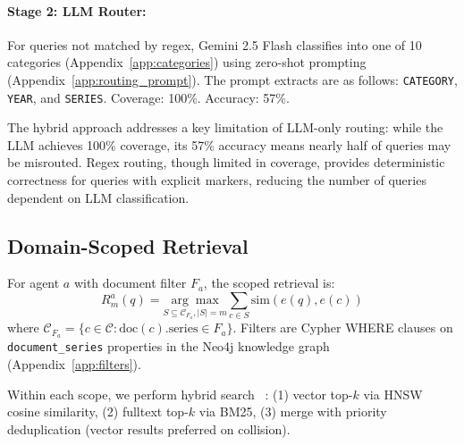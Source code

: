 \documentclass{article}
\begin{document}
\paragraph{Stage 2: LLM Router:} For queries not matched by regex, Gemini 2.5 Flash classifies into one of 10 categories (Appendix~\ref{app:categories}) using zero-shot prompting (Appendix~\ref{app:routing_prompt}). The prompt extracts are as follows: \texttt{CATEGORY}, \texttt{YEAR}, and \texttt{SERIES}. Coverage: 100\%. Accuracy: 57\%.


The hybrid approach addresses a key limitation of LLM-only routing: while the LLM achieves 100\% coverage, its 57\% accuracy means nearly half of queries may be misrouted. Regex routing, though limited in coverage, provides deterministic correctness for queries with explicit markers, reducing the number of queries dependent on LLM classification.

\subsection{Domain-Scoped Retrieval}
\label{sec:scoped_search}

For agent $a$ with document filter $F_a$, the scoped retrieval is:
\begin{equation}
R_m^a(q) = \underset{S \subseteq \mathcal{C}_{F_a}, |S|=m}{\arg\max} \sum_{c \in S} \text{sim}(e(q), e(c))
\end{equation}
where $\mathcal{C}_{F_a} = \{c \in \mathcal{C} : \text{doc}(c).\text{series} \in F_a\}$. Filters are Cypher WHERE clauses on \texttt{document\_series} properties in the Neo4j knowledge graph (Appendix~\ref{app:filters}).

Within each scope, we perform hybrid search ~\citep{sawarkar2024blended}: (1) vector top-$k$ via HNSW cosine similarity, (2) fulltext top-$k$ via BM25, (3) merge with priority deduplication (vector results preferred on collision).
\end{document}
